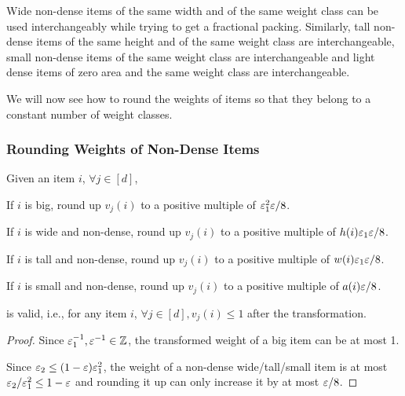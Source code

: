 Wide non-dense items of the same width and of the same weight class
can be used interchangeably while trying to get a fractional packing.
Similarly, tall non-dense items of the same height and of the same weight class are
interchangeable, small non-dense items of the same weight class are interchangeable
and light dense items of zero area and the same weight class are interchangeable.

We will now see how to round the weights of items so that they belong to a constant
number of weight classes.

\subsubsection{Rounding Weights of Non-Dense Items}

\begin{transformation}
\label{trn:wround-non-dense}
Given an item $i$, $\forall j \in [d]$,
\begin{tightemize}
\item If $i$ is big, round up $v_j(i)$ to a positive multiple of $\varepsilon_1^2\varepsilon/8$.
\item If $i$ is wide and non-dense, round up $v_j(i)$ to a positive multiple of
    $h(i) \varepsilon_1\varepsilon/8$.
\item If $i$ is tall and non-dense, round up $v_j(i)$ to a positive multiple of
    $w(i) \varepsilon_1\varepsilon/8$.
\item If $i$ is small and non-dense, round up $v_j(i)$ to a positive multiple of
    $a(i) \varepsilon/8$.
\end{tightemize}
\end{transformation}

\begin{lemma}
 is valid, i.e., for any item $i$,
$\forall j \in [d], v_j(i) \le 1$ after the transformation.
\end{lemma}
\begin{proof}
Since $\varepsilon_1^{-1}, \varepsilon^{-1} \in \mathbb{Z}$,
the transformed weight of a big item can be at most 1.

Since $\varepsilon_2 \le (1-\varepsilon)\varepsilon_1^2$,
the weight of a non-dense wide/tall/small item is at most $\varepsilon_2/\varepsilon_1^2 \le 1-\varepsilon$
and rounding it up can only increase it by at most $\varepsilon/8$.
\end{proof}

